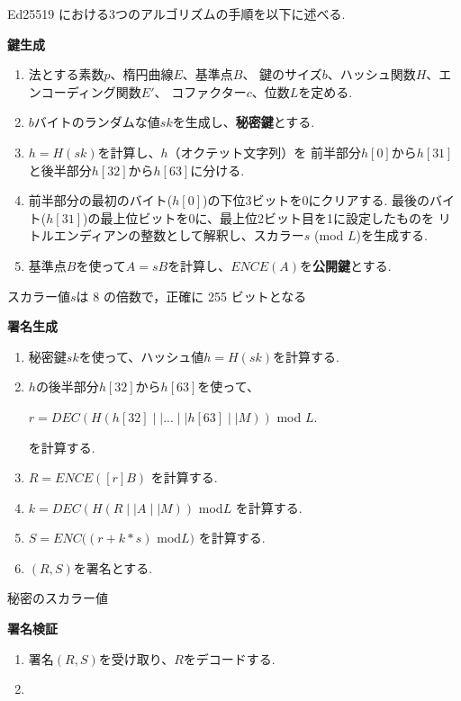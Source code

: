 Ed25519 における3つのアルゴリズムの手順を以下に述べる.\\[1em]
\begin{mdframed}[linecolor=black,roundcorner=10pt]
  \textbf{鍵生成}
  \begin{enumerate}[parsep=7pt]
    \item 法とする素数$p$、楕円曲線$E$、基準点$B$、
          鍵のサイズ$b$、ハッシュ関数$H$、エンコーディング関数$E'$、
          コファクター$c$、位数$L$を定める.
    \item $b$バイトのランダムな値$sk$を生成し、\textbf{秘密鍵}とする.
    \item $h = H(sk)$を計算し、$h$（オクテット文字列）を
    前半部分$h[0]$から$h[31]$と後半部分$h[32]$から$h[63]$に分ける.
    \item 前半部分の最初のバイト($h[0]$)の下位3ビットを0にクリアする.
    最後のバイト($h[31]$)の最上位ビットを0に、最上位2ビット目を1に設定したものを
    リトルエンディアンの整数として解釈し、スカラー$s$ (mod $L$)を生成する.
    \item 基準点$B$を使って$A = sB$を計算し、$ENCE(A)$を\textbf{公開鍵}とする.
  \end{enumerate}
  スカラー値$s$は 8 の倍数で，正確に 255 ビットとなる
\end{mdframed}
\vspace{2em}
\begin{mdframed}[linecolor=black,roundcorner=10pt]
  \textbf{署名生成}
  \begin{enumerate}[parsep=7pt]
    \item 秘密鍵$sk$を使って、ハッシュ値$h=H(sk)$を計算する.
    \item $h$の後半部分$h[32]$から$h[63]$を使って、
    \begin{center}
      $r = DEC(H(h[32]\mid\mid ... \mid\mid h[63] \mid\mid M))$ mod $L$.
    \end{center}
    を計算する.
    \item $R=ENCE([r]B)$ を計算する.
    \item $k=DEC(H(R \mid\mid A \mid\mid M))$ mod$L$ を計算する.
    \item $S=ENC((r+k*s)$ mod$L)$ を計算する.
    \item $(R,S)$を署名とする.
  \end{enumerate}
  秘密のスカラー値
\end{mdframed}
\vspace{2em}
\begin{mdframed}[linecolor=black,roundcorner=10pt]
  \textbf{署名検証}
  \begin{enumerate}[parsep=7pt]
    \item 署名$(R,S)$を受け取り、$R$をデコードする.
    \item
  \end{enumerate}
\end{mdframed}

